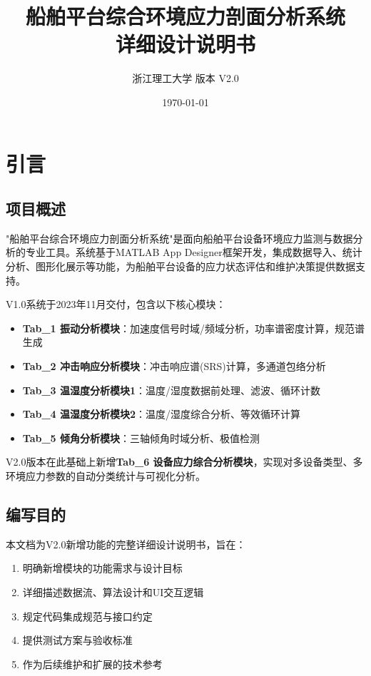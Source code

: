 \documentclass[12pt,a3paper]{ctexart}
\title{\textbf{船舶平台综合环境应力剖面分析系统 \\ 详细设计说明书}}
\author{浙江理工大学 \quad 版本 V2.0}
\date{\today}
\begin{document}
\maketitle
\newpage
\tableofcontents
\newpage

\section{引言}

\subsection{项目概述}

"船舶平台综合环境应力剖面分析系统"是面向船舶平台设备环境应力监测与数据分析的专业工具。系统基于MATLAB App Designer框架开发，集成数据导入、统计分析、图形化展示等功能，为船舶平台设备的应力状态评估和维护决策提供数据支持。

V1.0系统于2023年11月交付，包含以下核心模块：
\begin{itemize}
    \item \textbf{Tab\_1 振动分析模块}：加速度信号时域/频域分析，功率谱密度计算，规范谱生成
    \item \textbf{Tab\_2 冲击响应分析模块}：冲击响应谱(SRS)计算，多通道包络分析
    \item \textbf{Tab\_3 温湿度分析模块1}：温度/湿度数据前处理、滤波、循环计数
    \item \textbf{Tab\_4 温湿度分析模块2}：温度/湿度综合分析、等效循环计算
    \item \textbf{Tab\_5 倾角分析模块}：三轴倾角时域分析、极值检测
\end{itemize}

V2.0版本在此基础上新增\textbf{Tab\_6 设备应力综合分析模块}，实现对多设备类型、多环境应力参数的自动分类统计与可视化分析。

\subsection{编写目的}

本文档为V2.0新增功能的完整详细设计说明书，旨在：
\begin{enumerate}[label=(\arabic*)]
    \item 明确新增模块的功能需求与设计目标
    \item 详细描述数据流、算法设计和UI交互逻辑
    \item 规定代码集成规范与接口约定
    \item 提供测试方案与验收标准
    \item 作为后续维护和扩展的技术参考
\end{enumerate}
\end{document}

